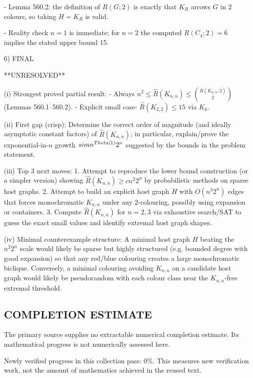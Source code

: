 - Lemma 560.2: the definition of $R(G;2)$ is exactly that $K_{R}$ arrows $G$ in 2 colours, so taking $H=K_R$ is valid.

- Reality check $n=1$ is immediate; for $n=2$ the computed $R(C_4;2)=6$ implies the stated upper bound 15.

6) FINAL

**UNRESOLVED**

(i) Strongest proved partial result:
- Always $n^2\le \hat R(K_{n,n})\le \binom{R(K_{n,n};2)}{2}$ (Lemmas 560.1–560.2).
- Explicit small case: $\hat R(K_{2,2})\le 15$ via $K_6$.

(ii) First gap (crisp):
Determine the correct order of magnitude (and ideally asymptotic constant factors) of $\hat R(K_{n,n})$; in particular, explain/prove the exponential-in-$n$ growth $\\sim n^{\\Theta(1)}2^n$ suggested by the bounds in the problem statement.

(iii) Top 3 next moves:
1. Attempt to reproduce the lower bound construction (or a simpler version) showing $\hat R(K_{n,n})\ge c n^2 2^n$ by probabilistic methods on sparse host graphs.
2. Attempt to build an explicit host graph $H$ with $O(n^3 2^n)$ edges that forces monochromatic $K_{n,n}$ under any 2-colouring, possibly using expansion or containers.
3. Compute $\hat R(K_{n,n})$ for $n=2,3$ via exhaustive search/SAT to guess the exact small values and identify extremal host graph shapes.

(iv) Minimal counterexample structure:
A minimal host graph $H$ beating the $n^2 2^n$ scale would likely be sparse but highly structured (e.g. bounded degree with good expansion) so that any red/blue colouring creates a large monochromatic biclique. Conversely, a minimal colouring avoiding $K_{n,n}$ on a candidate host graph would likely be pseudorandom with each colour class near the $K_{n,n}$-free extremal threshold.



\subsection*{COMPLETION ESTIMATE}
The primary source supplies no extractable numerical completion estimate. Its mathematical progress is not numerically assessed here.

Newly verified progress in this collection pass: $0\%$. This measures new verification work, not the amount of mathematics achieved in the reused text.
